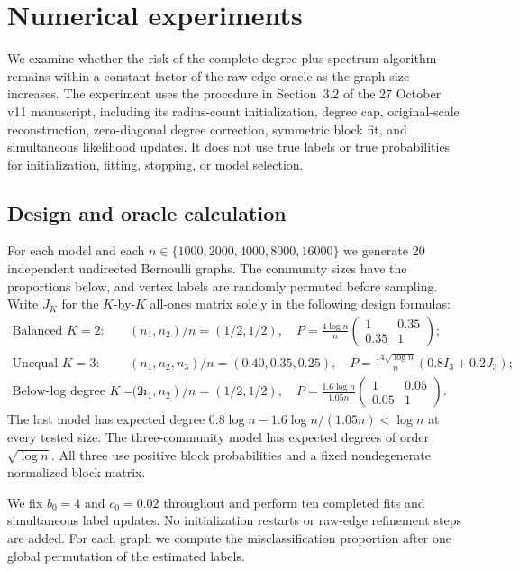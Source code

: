 \section{Numerical experiments}\label{sec:experiments}
We examine whether the risk of the complete degree-plus-spectrum algorithm remains within a constant factor of the raw-edge oracle as the graph size increases. The experiment uses the procedure in Section~3.2 of the 27 October v11 manuscript, including its radius-count initialization, degree cap, original-scale reconstruction, zero-diagonal degree correction, symmetric block fit, and simultaneous likelihood updates. It does not use true labels or true probabilities for initialization, fitting, stopping, or model selection.

\subsection{Design and oracle calculation}
For each model and each $n\in\{1000,2000,4000,8000,16000\}$ we generate 20 independent undirected Bernoulli graphs. The community sizes have the proportions below, and vertex labels are randomly permuted before sampling. Write $J_K$ for the $K$-by-$K$ all-ones matrix solely in the following design formulas:
\begin{align*}
\text{Balanced }K=2:\quad &
 (n_1,n_2)/n=(1/2,1/2),\quad P=\frac{4\log n}{n}
 \begin{pmatrix}1&0.35\\0.35&1\end{pmatrix};\\
\text{Unequal }K=3:\quad &
 (n_1,n_2,n_3)/n=(0.40,0.35,0.25),\quad P=\frac{14\sqrt{\log n}}{n}(0.8I_3+0.2J_3);\\
\text{Below-log degree }K=2:\quad &
 (n_1,n_2)/n=(1/2,1/2),\quad P=\frac{1.6\log n}{1.05n}
 \begin{pmatrix}1&0.05\\0.05&1\end{pmatrix}.
\end{align*}
The last model has expected degree
$0.8\log n-1.6\log n/(1.05n)<\log n$ at every tested size.
The three-community model has expected degrees of order $\sqrt{\log n}$.
All three use positive block probabilities and a fixed nondegenerate normalized block matrix.

We fix $b_0=4$ and $c_0=0.02$ throughout and perform ten completed fits and simultaneous label updates. No initialization restarts or raw-edge refinement steps are added. For each graph we compute the misclassification proportion after one global permutation of the estimated labels.

